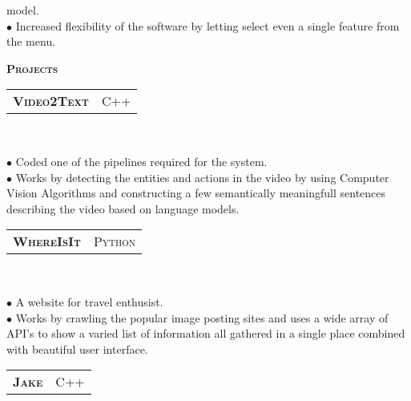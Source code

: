 \documentclass[10pt,a4paper,oneside]{article}
\begin{document}
\begin{minipage}[t]{0.63\textwidth}
\begin{adjustwidth}{7pt}{0pt}
{            model.\\
        $\bullet$ Increased flexibility of the software by letting select even a single feature from the menu.}\\
        \end{adjustwidth}
        \textcolor{light-gray}{\textbf{\large P\textsc{rojects}}}
        \vspace{10pt}\\
        \begin{tabular}{c|c}
            \textbf{\normalsize V\textsc{ideo}2T\textsc{ext}}
            &\textmd{\normalsize C\textsc{++}}
        \end{tabular}\\
        \vspace{-4mm}
        \begin{adjustwidth}{7pt}{0pt}
            {\footnotesize $\bullet$ Coded one of the pipelines required
            for the system.\\
            $\bullet$ Works by detecting the entities and actions in the
            video by using Computer Vision Algorithms and constructing a few
            semantically meaningfull sentences describing the video
            based on language models.}\\
        \end{adjustwidth}
        \begin{tabular}{c|c}
            \textbf{\normalsize W\textsc{here}I\textsc{s}I\textsc{t}}
            &\textmd{\normalsize P\textsc{ython}}
        \end{tabular}\\
         \vspace{-4mm}
        \begin{adjustwidth}{7pt}{0pt}
            {\footnotesize $\bullet$ A website for travel
            enthusist.\\
            $\bullet$ Works by crawling the popular image posting sites and
            uses a wide array of API's to show a varied list of
            information all gathered in a single place combined with
            beautiful user interface. }\\
        \end{adjustwidth}
        \begin{tabular}{c|c}
            \textbf{\normalsize J\textsc{ake}}
            &\textmd{\normalsize C\textsc{++}}
        \end{tabular}\\
         \vspace{-4mm}

\end{minipage}
\end{document}
